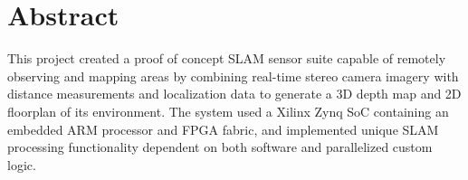 {}
\section*{Abstract}


This project created a proof of concept SLAM sensor suite capable of remotely observing and mapping areas by combining real-time stereo camera imagery with distance measurements and localization data to generate a 3D depth map and 2D floorplan of its environment. The system used a Xilinx Zynq SoC containing an embedded ARM processor and FPGA fabric, and implemented unique SLAM processing functionality dependent on both software and parallelized custom logic.